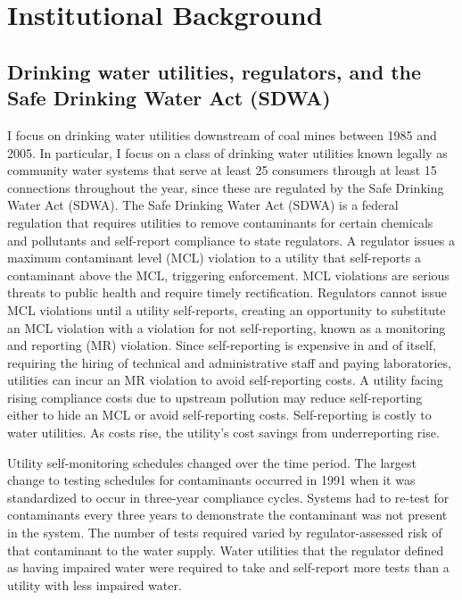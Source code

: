 \documentclass[12pt]{article}
\begin{document}
\section{Institutional Background}

\subsection{Drinking water utilities, regulators, and the Safe Drinking Water Act (SDWA)}

I focus on drinking water utilities downstream of coal mines between 1985 and 2005. In particular, I focus on a class of drinking water utilities known legally as community water systems that serve at least 25 consumers through at least 15 connections throughout the year, since these are regulated by the Safe Drinking Water Act (SDWA). The Safe Drinking Water Act (SDWA) is a federal regulation that requires utilities to remove contaminants for certain chemicals and pollutants and self-report compliance to state regulators. A regulator issues a maximum contaminant level (MCL) violation to a utility that self-reports a contaminant above the MCL, triggering enforcement. MCL violations are serious threats to public health and require timely rectification. Regulators cannot issue MCL violations until a utility self-reports, creating an opportunity to substitute an MCL violation with a violation for not self-reporting, known as a monitoring and reporting (MR) violation. Since self-reporting is expensive in and of itself, requiring the hiring of technical and administrative staff and paying laboratories, utilities can incur an MR violation to avoid self-reporting costs. A utility facing rising compliance costs due to upstream pollution may reduce self-reporting either to hide an MCL or avoid self-reporting costs. Self-reporting is costly to water utilities. As costs rise, the utility's cost savings from underreporting rise.

Utility self-monitoring schedules changed over the time period. The largest change to testing schedules for contaminants occurred in 1991 when it was standardized to occur in three-year compliance cycles. Systems had to re-test for contaminants every three years to demonstrate the contaminant was not present in the system. The number of tests required varied by regulator-assessed risk of that contaminant to the water supply. Water utilities that the regulator defined as having impaired water were required to take and self-report more tests than a utility with less impaired water. 
\end{document}
